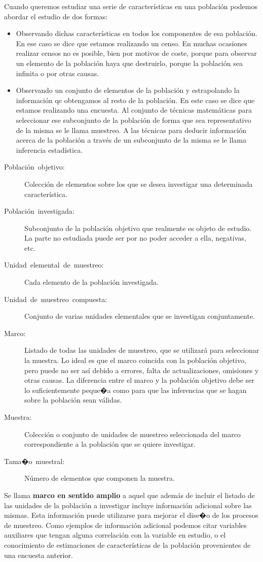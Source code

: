 Cuando queremos estudiar una serie de caracter\'isticas en una poblaci\'on
podemos abordar el estudio de dos formas:
\begin{itemize}
\item Observando dichas caracter\'isticas en todos los componentes de esa
poblaci\'on. En ese caso se dice que estamos realizando un censo. En
muchas ocasiones realizar censos no es posible, bien por motivos de
coste, porque para observar un elemento de la poblaci\'on haya que destruirlo,
porque la poblaci\'on sea infinita o por otras causas.
\item Observando un conjunto de elementos de la poblaci\'on y estrapolando
la informaci\'on qe obtengamos al resto de la poblaci\'on. En este caso
se dice que estamos realizando una encuesta. Al conjunto de t\'ecnicas
matem\'aticas para seleccionar ese subconjunto de la poblaci\'on de forma
que sea representativo de la misma se le llama muestreo. A las t\'ecnicas
para deducir informaci\'on acerca de la poblaci\'on a trav\'es de un subconjunto
de la misma se le llama inferencia estad\'istica.\end{itemize}
\begin{description}
\item [{Poblaci\'on~objetivo:}] Colecci\'on de elementos sobre los que se
desea investigar una determinada caracter\'istica.
\item [{Poblaci\'on~investigada:}] Subconjunto de la poblaci\'on objetivo
que realmente es objeto de estudio. La parte no estudiada puede ser
por no poder acceder a ella, negativas, etc.
\item [{Unidad~elemental~de~muestreo:}] Cada elemento de la poblaci\'on
investigada.
\item [{Unidad~de~muestreo~compuesta:}] Conjunto de varias unidades
elementales que se investigan conjuntamente.
\item [{Marco:}] Listado de todas las unidades de muestreo, que se utilizar\'a
para seleccionar la muestra. Lo ideal es que el marco coincida con
la poblaci\'on objetivo, pero puede no ser as\'i debido a errores, falta
de actualizaciones, omisiones y otras causas. La diferencia entre
el marco y la poblaci\'on objetivo debe ser lo suficientemente peque�a
como para que las inferencias que se hagan sobre la poblaci\'on sean
v\'alidas.
\item [{Muestra:}] Colecci\'on o conjunto de unidades de muestreo seleccionada
del marco correspondiente a la poblaci\'on que se quiere investigar.
\item [{Tama�o~muestral:}] N\'umero de elementos que componen la muestra.
\end{description}
Se llama \textbf{marco en sentido amplio} a aquel que adem\'as de incluir
el listado de las unidades de la poblaci\'on a investigar incluye informaci\'on
adicional sobre las mismas. Esta informaci\'on puede utilizarse para
mejorar el dise�o de los procesos de muestreo. Como ejemplos de informaci\'on
adicional podemos citar variables auxiliares que tengan alguna correlaci\'on
con la variable en estudio, o el conocimiento de estimaciones de caracter\'isticas
de la poblaci\'on provenientes de una encuesta anterior.

